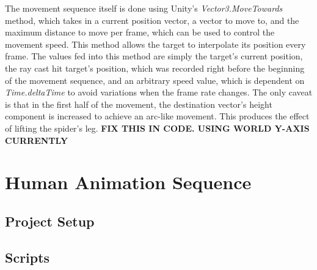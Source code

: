 The movement sequence itself is done using Unity's \textit{Vector3.MoveTowards}
method, which takes in a current position vector, a vector to move to, and the
maximum distance to move per frame, which can be used to control the movement
speed. This method allows the target to interpolate its position every frame.
The values fed into this method are simply the target's current position, the
ray cast hit target's position, which was recorded right before the beginning of
the movement sequence, and an arbitrary speed value, which is dependent on
\textit{Time.deltaTime} to avoid variations when the frame rate changes. The
only caveat is that in the first half of the movement, the destination vector's
height component is increased to achieve an arc-like movement. This produces the
effect of lifting the spider's leg. \textbf{FIX THIS IN CODE. USING WORLD Y-AXIS
CURRENTLY}


\section{Human Animation Sequence}
\subsection{Project Setup}
\subsection{Scripts}
